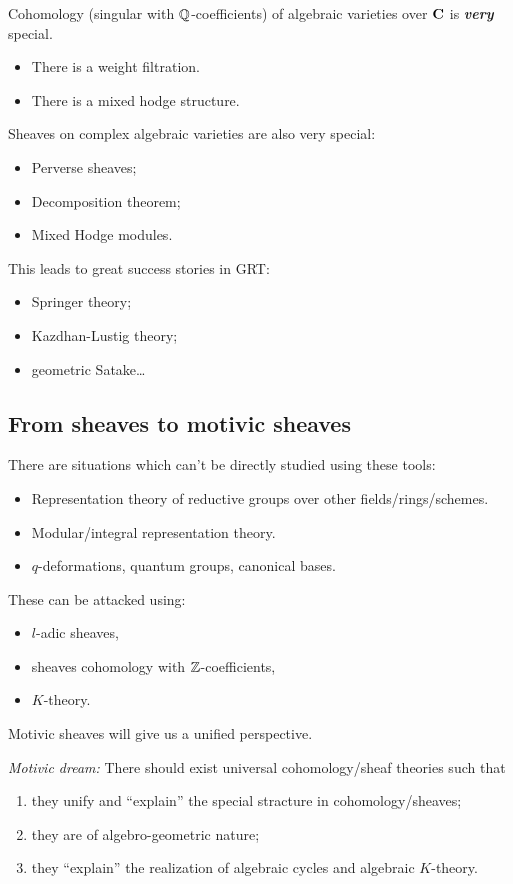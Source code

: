 Cohomology (singular with $\mathbb Q$-coefficients) of algebraic varieties over $\mathbf{C}$ is \emph{\textbf{very}} special.
\begin{itemize}
	\item There is a weight filtration.
	\item There is a mixed hodge structure.
\end{itemize}
Sheaves on complex algebraic varieties are also very special:
\begin{itemize}
	\item Perverse sheaves;
	\item Decomposition theorem;
	\item Mixed Hodge modules.
\end{itemize}
This leads to great success stories in GRT:
\begin{itemize}
	\item Springer theory;
	\item Kazdhan-Lustig theory;
	\item geometric Satake\dots
\end{itemize}

\subsection{From sheaves to motivic sheaves}
There are situations which can't be directly studied using these tools:
\begin{itemize}
	\item Representation theory of reductive groups over other fields/rings/schemes.
	\item Modular/integral representation theory.
	\item $q$-deformations, quantum groups, canonical bases.
\end{itemize}
These can be attacked using:
\begin{itemize}
	\item $l$-adic sheaves,
	\item sheaves cohomology with $\mathbb Z$-coefficients,
	\item $K$-theory.
\end{itemize}
Motivic sheaves will give us a unified perspective.

\emph{Motivic dream:} There should exist universal cohomology/sheaf theories such that
\begin{enumerate}[1)]
	\item they unify and ``explain'' the special stracture in cohomology/sheaves;
	\item they are of algebro-geometric nature;
	\item they ``explain'' the realization of algebraic cycles and algebraic $K$-theory.
\end{enumerate}

